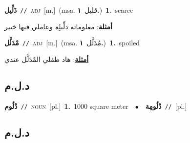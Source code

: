 \documentclass[10pt,a4paper,twoside]{article} %
\begin{document}
\begin{multicols}{2}
{\setlength\topsep{0pt}\textbf{\foreignlanguage{arabic}{دَلِّيل}}\ {\color{gray}\texttt{//}\color{black}}\ \textsc{adj}\ [m.]\ \color{gray}(msa. \foreignlanguage{arabic}{قليل}~\foreignlanguage{arabic}{\textbf{١.}})\color{black}\ \textbf{1.}~scarce\  \begin{flushright}\color{gray}\foreignlanguage{arabic}{\textbf{\underline{\foreignlanguage{arabic}{أمثلة}}}: معلوماته دلِّيلِة وعاملي فيها خبير}\end{flushright}\color{black}} \vspace{2mm}

{\setlength\topsep{0pt}\textbf{\foreignlanguage{arabic}{مْدَلَّل}}\ {\color{gray}\texttt{//}\color{black}}\ \textsc{adj}\ [m.]\ \color{gray}(msa. \foreignlanguage{arabic}{مُدَلَّل}~\foreignlanguage{arabic}{\textbf{١.}})\color{black}\ \textbf{1.}~spoiled\  \begin{flushright}\color{gray}\foreignlanguage{arabic}{\textbf{\underline{\foreignlanguage{arabic}{أمثلة}}}: هاد طفلي المْدَلَّل عندي}\end{flushright}\color{black}} \vspace{2mm}

\vspace{-3mm}
\subsection*{\color{blue}\foreignlanguage{arabic}{د.ل.م}\color{blue}{}} 

{\setlength\topsep{0pt}\textbf{\foreignlanguage{arabic}{دْلُوم}}\ {\color{gray}\texttt{//}\color{black}}\ \textsc{noun}\ [pl.]\ \textbf{1.}~1000 square meter\ \ $\bullet$\ \ \setlength\topsep{0pt}\textbf{\foreignlanguage{arabic}{دْلُومِة}}\ {\color{gray}\texttt{//}\color{black}}\ [pl.]\ } \vspace{2mm}

\vspace{-3mm}
\subsection*{\color{blue}\foreignlanguage{arabic}{د.ل.م}\color{blue}{ (ntws)}} 


\end{multicols}
\end{document}
